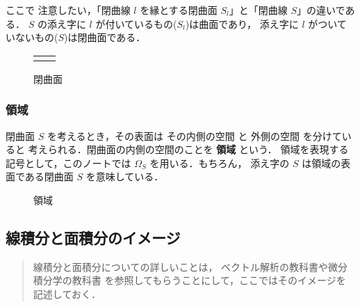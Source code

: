     ここで
    注意したい，「閉曲線 $l$ を縁とする閉曲面 $S_{l}$」と「閉曲線 $S$」の違いである．
    $S$ の添え字に $l$ が付いているもの($S_{l}$)は曲面であり，
    添え字に $l$ がついていないもの($S$)は閉曲面である．
                \begin{figure}[hbt]
                    \begin{tabular}{cc}
                        \begin{minipage}{0.5\hsize}
                    \begin{center}
                        {kyokumenn.pdf}
                        \caption{曲面}
                        \label{fig:kyokumenn}
                    \end{center}
                        \end{minipage}
                        \begin{minipage}{0.5\hsize}
                    \begin{center}
                        {heikyokumenn.pdf}
                        \caption{閉曲面}
                        \label{fig:heikyokumenn}
                    \end{center}
                        \end{minipage}
                    \end{tabular}
                \end{figure}

 \subsubsection{領域}
    閉曲面 $S$ を考えるとき，その表面は その内側の空間 と 外側の空間 を分けていると
    考えられる．閉曲面の内側の空間のことを \textbf{領域} という．
    領域を表現する記号として，このノートでは $\Omega_{S}$ を用いる．もちろん，
    添え字の $S$ は領域の表面である閉曲面 $S$ を意味している．
                \begin{figure}[hbt]
                    \begin{center}
                        \caption{領域}
                        \label{fig:ryoiki}
                    \end{center}
                \end{figure}

 \subsection{線積分と面積分のイメージ}
    \begin{quotation}\small
    線積分と面積分についての詳しいことは，
    ベクトル解析の教科書や微分積分学の教科書
    を参照してもらうことにして，ここではそのイメージを
    記述しておく．
    \end{quotation}

